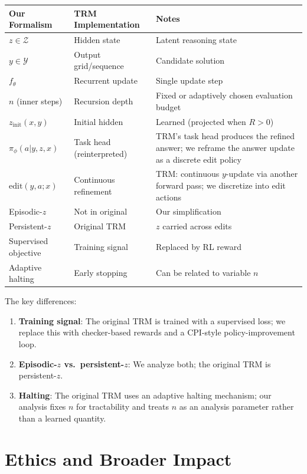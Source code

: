 \documentclass{article}
\theoremstyle{plain}
\theoremstyle{definition}
\theoremstyle{remark}
\newcommand{\YY}{\mathcal{Y}}
\newcommand{\ZZ}{\mathcal{Z}}
\begin{document}
\begin{center}
\begin{tabularx}{\linewidth}{@{}llX@{}}
\toprule
Our Formalism & TRM Implementation & Notes \\
\midrule
$z \in \ZZ$ & Hidden state & Latent reasoning state \\
$y \in \YY$ & Output grid/sequence & Candidate solution \\
$f_\theta$ & Recurrent update & Single update step \\
$n$ (inner steps) & Recursion depth & Fixed or adaptively chosen evaluation budget \\
$z_{\mathrm{init}}(x,y)$ & Initial hidden & Learned (projected when $R>0$) \\
$\pi_\phi(a|y,z,x)$ & Task head (reinterpreted) & TRM's task head produces the refined answer; we reframe the answer update as a discrete edit policy \\
$\mathrm{edit}(y,a;x)$ & Continuous refinement & TRM: continuous $y$-update via another forward pass; we discretize into edit actions \\
\midrule
Episodic-$z$ & Not in original & Our simplification \\
Persistent-$z$ & Original TRM & $z$ carried across edits \\
Supervised objective & Training signal & Replaced by RL reward \\
Adaptive halting & Early stopping & Can be related to variable $n$ \\
\bottomrule
\end{tabularx}
\end{center}

The key differences:
\begin{enumerate}
\item \textbf{Training signal}: The original TRM is trained with a supervised loss; we replace this with checker-based rewards and a CPI-style policy-improvement loop.
\item \textbf{Episodic-$z$ vs.\ persistent-$z$}: We analyze both; the original TRM is persistent-$z$.
\item \textbf{Halting}: The original TRM uses an adaptive halting mechanism; our analysis fixes $n$ for tractability and treats $n$ as an analysis parameter rather than a learned quantity.
\end{enumerate}
\section{Ethics and Broader Impact}
\label{app:ethics_broader}
\end{document}
